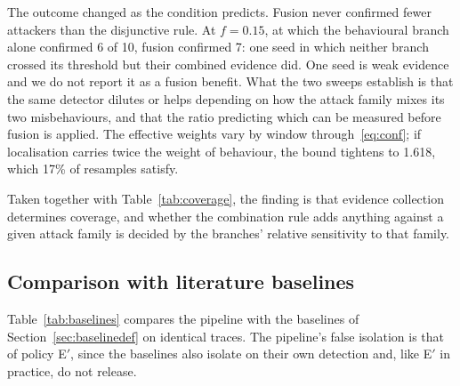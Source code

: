 \documentclass[pdflatex,sn-mathphys-num]{sn-jnl}%
\theoremstyle{thmstyleone}%
\theoremstyle{thmstyletwo}%
\theoremstyle{thmstylethree}%
\begin{document}
The outcome changed as the condition predicts. Fusion never confirmed fewer
attackers than the disjunctive rule. At $f = 0.15$, at which the behavioural
branch alone confirmed 6 of 10, fusion confirmed 7: one seed in which neither
branch crossed its threshold but their combined evidence did. One seed is weak
evidence and we do not report it as a fusion benefit. What the two sweeps
establish is that the same detector dilutes or helps depending on how the
attack family mixes its two misbehaviours, and that the ratio predicting which
can be measured before fusion is applied. The effective weights vary by window
through~\eqref{eq:conf}; if localisation carries twice the weight of behaviour,
the bound tightens to 1.618, which 17\% of resamples satisfy.

Taken together with Table~\ref{tab:coverage}, the finding is that evidence
collection determines coverage, and whether the combination rule adds anything
against a given attack family is decided by the branches' relative
sensitivity to that family.

\subsection{Comparison with literature baselines}
\label{sec:baselines}

Table~\ref{tab:baselines} compares the pipeline with the baselines of
Section~\ref{sec:baselinedef} on identical traces. The pipeline's false
isolation is that of policy E$'$, since the baselines also isolate on their
own detection and, like E$'$ in practice, do not release.
\end{document}
